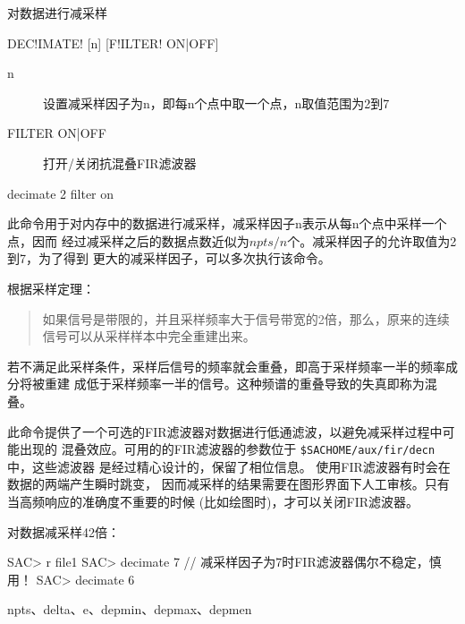 \label{cmd:decimate}

对数据进行减采样

\begin{SACSTX}
DEC!IMATE! [n] [F!ILTER! ON|OFF]
\end{SACSTX}

\begin{description}
\item [n] 设置减采样因子为n，即每n个点中取一个点，n取值范围为2到7
\item [FILTER ON|OFF] 打开/关闭抗混叠FIR滤波器
\end{description}

\begin{SACDFT}
decimate 2 filter on
\end{SACDFT}

此命令用于对内存中的数据进行减采样，减采样因子n表示从每n个点中采样一个点，因而
经过减采样之后的数据点数近似为$npts/n$个。减采样因子的允许取值为2到7，为了得到
更大的减采样因子，可以多次执行该命令。

根据采样定理：
\begin{quote}
如果信号是带限的，并且采样频率大于信号带宽的2倍，那么，原来的连续信号可以从采样样本中完全重建出来。
\end{quote}
若不满足此采样条件，采样后信号的频率就会重叠，即高于采样频率一半的频率成分将被重建
成低于采样频率一半的信号。这种频谱的重叠导致的失真即称为混叠。

此命令提供了一个可选的FIR滤波器对数据进行低通滤波，以避免减采样过程中可能出现的
混叠效应。可用的的FIR滤波器的参数位于 \verb|$SACHOME/aux/fir/decn| 中，这些滤波器
是经过精心设计的，保留了相位信息。
使用FIR滤波器有时会在数据的两端产生瞬时跳变，
因而减采样的结果需要在图形界面下人工审核。只有当高频响应的准确度不重要的时候
(比如绘图时)，才可以关闭FIR滤波器。

对数据减采样42倍：
\begin{SACCode}
SAC> r file1
SAC> decimate 7     // 减采样因子为7时FIR滤波器偶尔不稳定，慎用！
SAC> decimate 6
\end{SACCode}

npts、delta、e、depmin、depmax、depmen